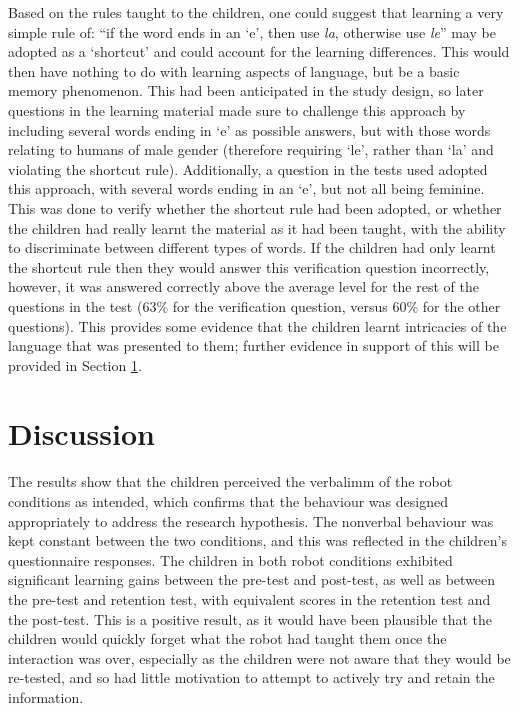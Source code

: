 Based on the rules taught to the children, one could suggest that learning a very simple rule of: ``if the word ends in an `e', then use \textit{la}, otherwise use \textit{le}'' may be adopted as a `shortcut' and could account for the \gls{learning} differences. This would then have nothing to do with learning aspects of language, but be a basic memory phenomenon. This had been anticipated in the study design, so later questions in the learning material made sure to challenge this approach by including several words ending in `e' as possible answers, but with those words relating to humans of male gender (therefore requiring `le', rather than `la' and violating the shortcut rule). Additionally, a question in the tests used adopted this approach, with several words ending in an `e', but not all being feminine. This was done to verify whether the shortcut rule had been adopted, or whether the children had really learnt the material as it had been taught, with the ability to discriminate between different types of words. If the children had only learnt the shortcut rule then they would answer this verification question incorrectly, however, it was answered correctly above the average level for the rest of the questions in the test (63\% for the verification question, versus 60\% for the other questions). This provides some evidence that the children learnt intricacies of the language that was presented to them; further evidence in support of this will be provided in Section \ref{sec:verbal-discussion}.

\section{Discussion} \label{sec:verbal-discussion}
The results show that the children perceived the \gls{verbalimm} of the robot conditions as intended, which confirms that the behaviour was designed appropriately to address the research hypothesis. The nonverbal behaviour was kept constant between the two conditions, and this was reflected in the children's questionnaire responses. The children in both robot conditions exhibited significant \gls{learning} gains between the pre-test and post-test, as well as between the pre-test and retention test, with equivalent scores in the retention test and the post-test. This is a positive result, as it would have been plausible that the children would quickly forget what the robot had taught them once the interaction was over, especially as the children were not aware that they would be re-tested, and so had little motivation to attempt to actively try and retain the information.

